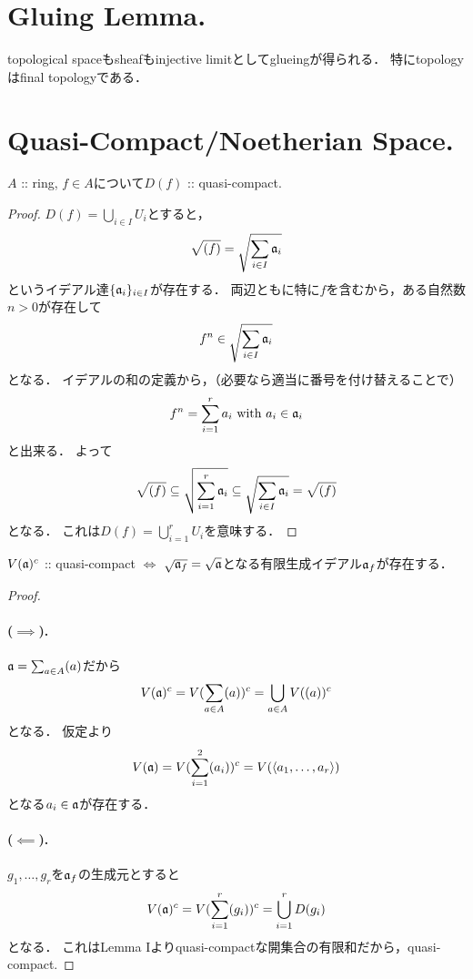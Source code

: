 \documentclass[a4paper]{jsarticle}
\begin{document}
\section{Gluing Lemma.} %
    topological spaceもsheafもinjective limitとしてglueingが得られる．
    特にtopologyはfinal topologyである．

\section{Quasi-Compact/Noetherian Space.} %
    \begin{Lemma}[I]
        $A$ :: ring, $f \in A$について$D(f)$ :: quasi-compact.
    \end{Lemma}
    \begin{proof}
        $D(f)=\bigcup_{i \in I} U_i$とすると，
        \[ \sqrt{(f)}=\sqrt{\sum_{i \in I} \mathfrak{a}_i} \]
        というイデアル達$\{\mathfrak{a}_i\}_{i \in I}$が存在する．
        両辺ともに特に$f$を含むから，ある自然数$n>0$が存在して
        \[ f^n \in \sqrt{\sum_{i \in I} \mathfrak{a}_i} \]
        となる．
        イデアルの和の定義から，（必要なら適当に番号を付け替えることで）
        \[ f^n=\sum_{i=1}^{r} a_i \text{ with } a_i \in \mathfrak{a}_i \]
        と出来る．
        よって
        \[
            \sqrt{(f)}
            \subseteq \sqrt{\sum_{i=1}^{r} \mathfrak{a}_i}
            \subseteq \sqrt{\sum_{i \in I} \mathfrak{a}_i}=\sqrt{(f)}
        \]
        となる．
        これは$D(f)=\bigcup_{i=1}^r U_i$を意味する．
    \end{proof}
    \begin{Lemma}[II]
        $V(\mathfrak{a})^c$ :: quasi-compact
        $\iff$
        $\sqrt{\mathfrak{a}_f}=\sqrt{\mathfrak{a}}$となる有限生成イデアル$\mathfrak{a}_f$が存在する．
    \end{Lemma}
    \begin{proof}
        \paragraph{($\implies$).}
        $\mathfrak{a}=\sum_{a \in A} (a)$だから
        \[ V(\mathfrak{a})^c=V(\sum_{a \in A} (a))^c=\bigcup_{a \in A} V((a))^c \]となる．
        仮定より
        \[ V(\mathfrak{a})=V(\sum_{i=1}^2 (a_i))^c=V(\langle a_1,\dots,a_r\rangle) \]
        となる$a_i \in \mathfrak{a}$が存在する．

        \paragraph{($\impliedby$).}
        $g_1,\dots,g_r$を$\mathfrak{a}_f$の生成元とすると
        \[ V(\mathfrak{a})^c=V(\sum_{i=1}^r (g_i))^c=\bigcup_{i=1}^r D(g_i) \]となる．
        これはLemma Iよりquasi-compactな開集合の有限和だから，quasi-compact.
    \end{proof}
\end{document}
